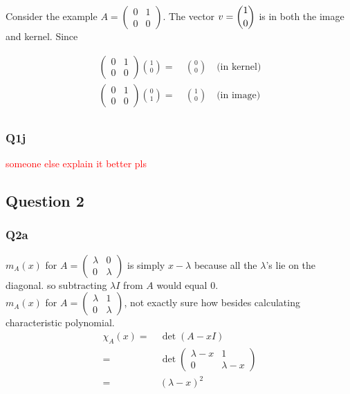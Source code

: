 Consider the example $A=\begin{pmatrix}
	0&1\\
	0&0
\end{pmatrix}$. The vector $v=\dbinom{1}{0}$ is in both the image and kernel. Since

\begin{align*}
\begin{pmatrix}
	0&1\\
	0&0
\end{pmatrix}\binom{1}{0}=&\ \binom{0}{0} \quad\text{(in kernel)}\\
\begin{pmatrix}
	0&1\\
	0&0
\end{pmatrix}\binom{0}{1}=&\ \binom{1}{0}\quad\text{(in image)}\\
\end{align*}

\subsubsection{Q1j}
\textcolor{red}{someone else explain it better pls}


\subsection{Question 2}
\subsubsection{Q2a}
$m_A(x)$ for $A=\begin{pmatrix}
	\lambda&0\\ 0& \lambda\end{pmatrix}$ is simply $x-\lambda$ because all the $\lambda$'s lie on the diagonal. so subtracting $\lambda I$ from $A$ would equal 0.\\ 	
$m_A(x)$ for $A=\begin{pmatrix}
	\lambda&1\\ 0& \lambda\end{pmatrix}$, not exactly sure how besides calculating characteristic polynomial.
\begin{align*}
\chi_A(x)=&\ \det(A-xI)\\
=&\ \det \begin{pmatrix}
	\lambda-x&1\\ 0& \lambda-x\end{pmatrix}\\
	=&\ (\lambda-x)^2
\end{align*}


